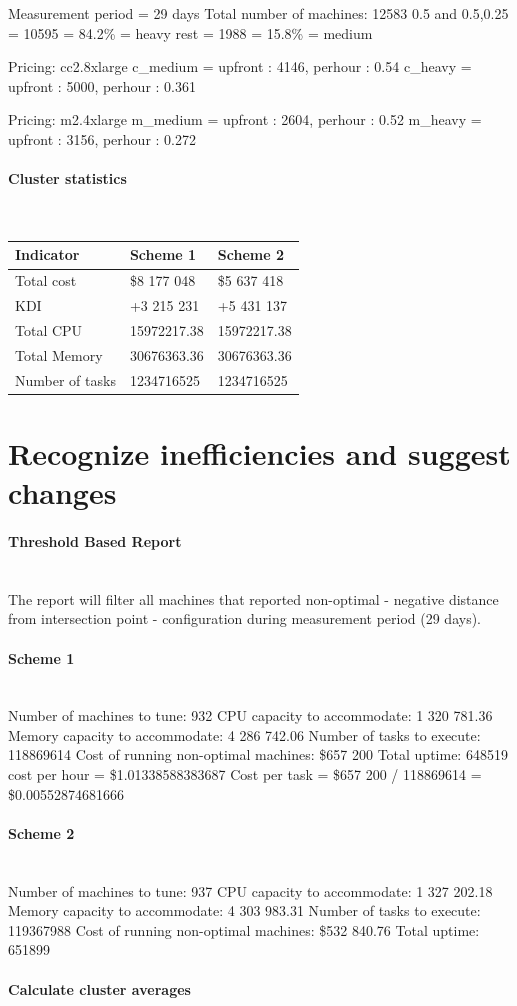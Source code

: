 \documentclass[]{final_report}
\newcommand{\myparagraph}[1]{\paragraph{#1}\mbox{}\\}
\begin{document}
Measurement period = 29 days
Total number of machines: 12583
0.5 and 0.5,0.25 = 10595 = 84.2\% = heavy
rest = 1988 = 15.8\% = medium

Pricing: cc2.8xlarge
c_medium = upfront : 4146, perhour : 0.54 
c_heavy = upfront : 5000, perhour : 0.361

Pricing: m2.4xlarge
m_medium = upfront : 2604, perhour : 0.52 
m_heavy = upfront : 3156, perhour : 0.272 


\myparagraph{Cluster statistics}
\begin{center}
    \begin{tabular}{| l | l | l |}
    \hline
    Indicator & Scheme 1 & Scheme 2 \\
    \hline
    Total cost & \$8 177 048 & \$5 637 418 \\
    \hline
    KDI & +3 215 231 & +5 431 137 \\
    \hline
    Total CPU & 15972217.38 & 15972217.38 \\
    \hline
    Total Memory & 30676363.36 & 30676363.36 \\
    \hline
    Number of tasks & 1234716525 & 1234716525 \\
    \hline
    \end{tabular}
\end{center}

\section{Recognize inefficiencies and suggest changes}

\myparagraph{Threshold Based Report}

The report will filter all machines that reported non-optimal - negative distance from intersection point - configuration during measurement period (29 days).

\myparagraph{Scheme 1}
Number of machines to tune: 932
CPU capacity to accommodate: 1 320 781.36
Memory capacity to accommodate: 4 286 742.06
Number of tasks to execute: 118869614
Cost of running non-optimal machines: \$657 200
Total uptime: 648519
cost per hour = \$1.01338588383687
Cost per task =  \$657 200 / 118869614 = \$0.00552874681666

\myparagraph{Scheme 2}
Number of machines to tune: 937
CPU capacity to accommodate: 1 327 202.18
Memory capacity to accommodate: 4 303 983.31
Number of tasks to execute: 119367988
Cost of running non-optimal machines: \$532 840.76
Total uptime: 651899

\myparagraph{Calculate cluster averages}
\end{document}
